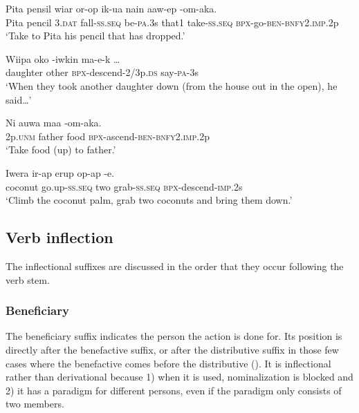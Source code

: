 \ea%
\label{ex:3:x430}
\gll Pita pensil wiar or-op ik-ua nain aaw-ep -om-aka.\\
Pita pencil 3.\textsc{dat} fall-\textsc{ss}.\textsc{seq} be-\textsc{pa}.3s that1 take-\textsc{ss}.\textsc{seq} \textsc{bpx}-go-\textsc{ben}-\textsc{bnfy}2.\textsc{imp}.2p\\
\glt`Take to Pita his pencil that has dropped.'
\z

\ea%
\label{ex:3:x222}
\gll Wiipa oko -iwkin ma-e-k {\dots} \\
daughter other \textsc{bpx}-descend-2/3p.\textsc{ds} say-\textsc{pa}-3s \\
\glt`When they took another daughter down (from the house out in the open), he said{\dots}' 
\z

\ea%
\label{ex:3:x223}
\gll Ni auwa maa -om-aka. \\
2p.\textsc{unm} father food \textsc{bpx}-ascend-\textsc{ben}-\textsc{bnfy}2.\textsc{imp}.2p \\
\glt`Take food (up) to father.'
\z

\ea%
\label{ex:3:x224}
\gll Iwera ir-ap erup op-ap -e. \\
coconut go.up-\textsc{ss}.\textsc{seq} two grab-\textsc{ss}.\textsc{seq} \textsc{bpx}-descend-\textsc{imp}.2s \\
\glt`Climb the coconut palm, grab two coconuts and bring them down.' 
\z

\subsection{Verb inflection} 
{}
The inflectional suffixes are discussed in the order that they occur following the verb stem.
%
%

\subsubsection{Beneficiary}\label{sec:3.8.3.1}
{}
The beneficiary suffix indicates the person the action is done for. Its position is directly after the benefactive suffix, or after the distributive suffix in those few cases where the benefactive comes before the distributive (). It is inflectional rather than derivational because 1) when it is used, nominalization is blocked and 2) it has a paradigm for different persons, even if the paradigm only consists of two members. 

